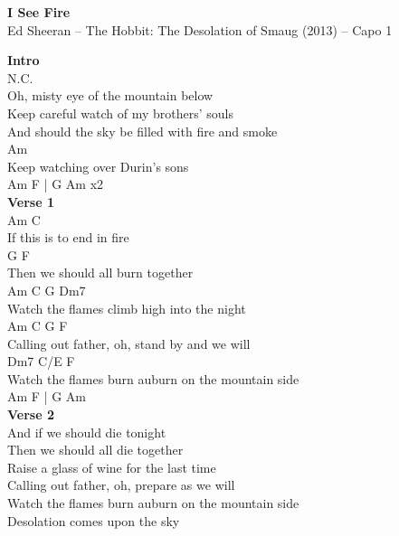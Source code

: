 \documentclass[a4paper]{article}
\begin{document}
    \begin{center}
        \textbf{I See Fire}
        ~\\
        Ed Sheeran -- The Hobbit: The Desolation of Smaug (2013)
         -- Capo 1
    \end{center}
    {
        \scriptsize
        \textbf{Intro}
        ~\\
        {
            \cutive
            \obeyspaces
N.C.
\\
Oh, misty eye of the mountain below
\\
Keep careful watch of my brothers' souls
\\
And should the sky be filled with fire and smoke
\\
                           Am
\\
Keep watching over Durin's sons
\\
Am F | G Am   x2
\\

        }
        \textbf{Verse 1}
        ~\\
        {
            \cutive
            \obeyspaces
              Am     C
\\
If this is to end in fire
\\
               G        F
\\
Then we should all burn together
\\
          Am           C    G        Dm7
\\
Watch the flames climb high into the night
\\
        Am    C         G            F
\\
Calling out father, oh, stand by and we will
\\
          Dm7         C/E           F
\\
Watch the flames burn auburn on the mountain side
\\
Am F | G Am
\\

        }
        \textbf{Verse 2}
        ~\\
        {
            \cutive
            \obeyspaces
And if we should die tonight
\\
Then we should all die together
\\
Raise a glass of wine for the last time
\\
Calling out father, oh, prepare as we will
\\
Watch the flames burn auburn on the mountain side
\\
Desolation comes upon the sky
\\

}}
\end{document}
